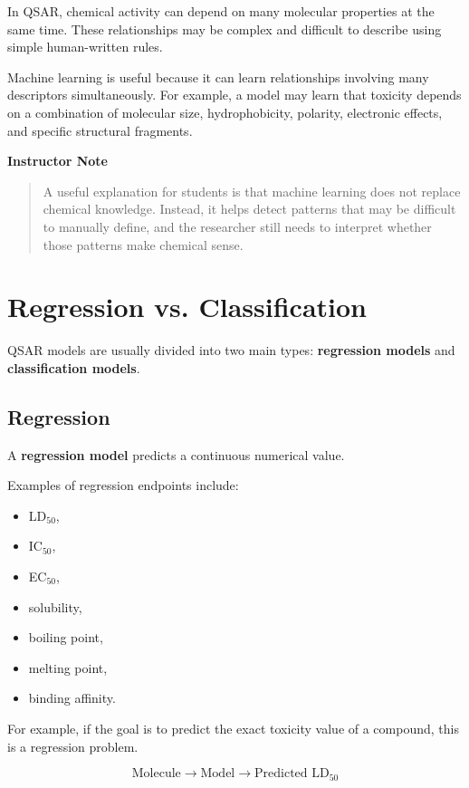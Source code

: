 \documentclass[11pt]{report}
\newenvironment{Important note}{\begin{quote}\color{red}\textbf{Important note:} }{\end{quote}}
\newenvironment{instructornote}
{\vspace{0.5em}\noindent\textbf{Instructor Note}\begin{quote}}
{\end{quote}\vspace{0.5em}}
\begin{document}
In QSAR, chemical activity can depend on many molecular properties at the same time. These relationships may be complex and difficult to describe using simple human-written rules.

Machine learning is useful because it can learn relationships involving many descriptors simultaneously. For example, a model may learn that toxicity depends on a combination of molecular size, hydrophobicity, polarity, electronic effects, and specific structural fragments.

\begin{instructornote}
A useful explanation for students is that machine learning does not replace chemical knowledge. Instead, it helps detect patterns that may be difficult to manually define, and the researcher still needs to interpret whether those patterns make chemical sense.
\end{instructornote}

\section{Regression vs. Classification}

QSAR models are usually divided into two main types: \textbf{regression models} and \textbf{classification models}.

\subsection{Regression}

A \textbf{regression model} predicts a continuous numerical value.

Examples of regression endpoints include:

\begin{itemize}[leftmargin=*]
    \item LD$_{50}$,
    \item IC$_{50}$,
    \item EC$_{50}$,
    \item solubility,
    \item boiling point,
    \item melting point,
    \item binding affinity.
\end{itemize}

For example, if the goal is to predict the exact toxicity value of a compound, this is a regression problem.

\[
\text{Molecule} \rightarrow \text{Model} \rightarrow \text{Predicted LD}_{50}
\]
\end{document}
